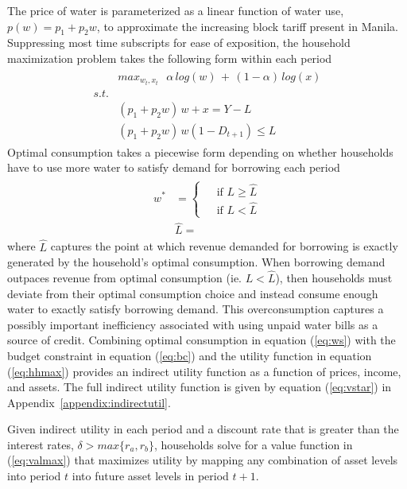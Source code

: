 \documentclass[12pt]{article}
\begin{document}
The price of water is parameterized as a linear function of water use, $p(w) = p_1 + p_2w$, to approximate the increasing block tariff present in Manila.  Suppressing most time subscripts for ease of exposition, the household maximization problem takes the following form within each period
\begin{align}\label{eq:hhmax}
\begin{split}
&max_{w_t,x_t} \,\,\,\, \alpha\, log(w) \, + \, (1-\alpha)\,log(x) \\
s.t.& \\
\,\,\,\, &(p_1 + p_2 w)\,w + x  =  Y - L \\
&(p_1 + p_2 w)\,w (1-D_{t+1}) \leq L  
\end{split}
\end{align}
Optimal consumption takes a piecewise form depending on whether households have to use more water to satisfy demand for borrowing each period
\begin{align}\label{eq:ws}
\begin{split}
w^{*} &= 
\begin{cases}
 &\text{ if } L \geq \widehat{L} \\
 &\text{ if } L < \widehat{L}
\end{cases} \\
&\widehat{L} = 
\end{split}
\end{align}
where $\widehat{L}$ captures the point at which revenue demanded for borrowing is exactly generated by the household's optimal consumption.  When borrowing demand outpaces revenue from optimal consumption (ie. $L<\widehat{L}$), then households must deviate from their optimal consumption choice and instead consume enough water to exactly satisfy borrowing demand.  This overconsumption captures a possibly important inefficiency associated with using unpaid water bills as a source of credit.  Combining optimal consumption in equation (\ref{eq:ws}) with the budget constraint in equation (\ref{eq:bc}) and the utility function in equation (\ref{eq:hhmax}) provides an indirect utility function as a function of prices, income, and assets.  The full indirect utility function is given by equation (\ref{eq:vstar}) in Appendix~\ref{appendix:indirectutil}.

Given indirect utility in each period and a discount rate that is greater than the interest rates, $\delta>max \{r_a,r_b\}$, households solve for a value function in (\ref{eq:valmax}) that maximizes utility by mapping any combination of asset levels into period $t$ into future asset levels in period $t+1$.
\end{document}
